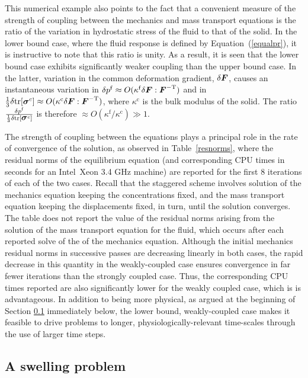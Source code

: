 This numerical example also points to the fact that a convenient
measure of the strength of coupling between the mechanics and mass
transport equations is the ratio of the variation in hydrostatic
stress of the fluid to that of the solid. In the lower bound case,
where the fluid response is defined by Equation~(\ref{equalpr}), it is
instructive to note that this ratio is unity. As a result, it is seen
that the lower bound case exhibits significantly weaker coupling than
the upper bound case. In the latter, variation in the common
deformation gradient, $\delta \mbox{\boldmath$ F$}$, causes an instantaneous variation
in \mbox{$\delta p^{\mathrm{f}} \approx O(\kappa^{\mathrm{f}} \delta
  \mbox{\boldmath$ F$}:\mbox{\boldmath$ F$}^{-\mathrm{T}})$} and in \mbox{$\frac{1}{3}
  \delta\mathrm{tr}[\mbox{\boldmath$\sigma$}^{c}] \approx O(\kappa^{\mathrm{c}}
  \delta \mbox{\boldmath$ F$}:\mbox{\boldmath$ F$}^{-\mathrm{T}})$}, where $\kappa^{\mathrm{c}}$ is the
bulk modulus of the solid. The ratio $\frac{\delta
  p^{\mathrm{f}}}{\frac{1}{3} \delta
  \mathrm{tr}[\mbox{\boldmath$\sigma$}^{c}]}$ is therefore \mbox{$\approx
  O(\kappa^{\mathrm{f}}/\kappa^{\mathrm{c}}) \gg 1$}.

The strength of coupling between the equations plays a principal role
in the rate of convergence of the solution, as observed in
Table~\ref{resnorms}, where the residual norms of the equilibrium
equation (and corresponding CPU times in seconds for an
\mbox{Intel\textregistered\ Xeon} 3.4 GHz machine) are reported for
the first 8 iterations of each of the two cases. Recall that the
staggered scheme involves solution of the mechanics equation keeping
the concentrations fixed, and the mass transport equation keeping the
displacements fixed, in turn, until the solution converges. The table
does not report the value of the residual norms arising from the
solution of the mass transport equation for the fluid, which occurs
after each reported solve of the of the mechanics equation. Although
the initial mechanics residual norms in successive passes are
decreasing linearly in both cases, the rapid decrease in this quantity
in the weakly-coupled case ensures convergence in far fewer iterations
than the strongly coupled case. Thus, the corresponding CPU times
reported are also significantly lower for the weakly coupled case,
which is is advantageous. In addition to being more physical, as
argued at the beginning of Section \ref{swelling-1} immediately below,
the lower bound, weakly-coupled case makes it feasible to drive
problems to longer, physiologically-relevant time-scales through the
use of larger time steps.

\subsection{A swelling problem}
\label{swelling-1}

